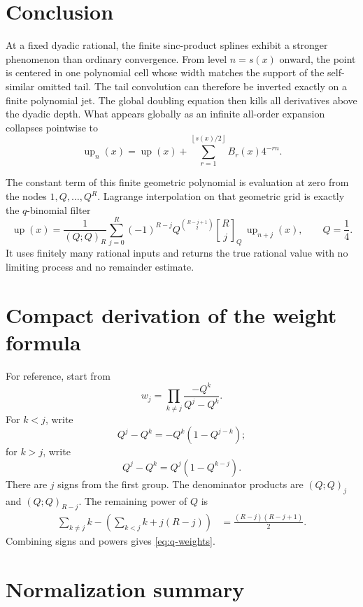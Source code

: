 \documentclass[11pt]{article}
\theoremstyle{definition}
\theoremstyle{remark}
\newcommand{\rv}{\operatorname{up}}
\newcommand{\qbinom}[3]{\genfrac{[}{]}{0pt}{}{#1}{#2}_{#3}}
\newcommand{\floor}[1]{\left\lfloor #1\right\rfloor}
\begin{document}
\section{Conclusion}

At a fixed dyadic rational, the finite sinc-product splines exhibit a stronger
phenomenon than ordinary convergence.  From level \(n=s(x)\) onward, the point
is centered in one polynomial cell whose width matches the support of the
self-similar omitted tail.  The tail convolution can therefore be inverted
exactly on a finite polynomial jet.  The global doubling equation then kills
all derivatives above the dyadic depth.  What appears globally as an infinite
all-order expansion collapses pointwise to
\[
 \rv_n(x)=\rv(x)+\sum_{r=1}^{\floor{s(x)/2}}B_r(x)4^{-rn}.
\]

The constant term of this finite geometric polynomial is evaluation at zero
from the nodes \(1,Q,\ldots,Q^R\).  Lagrange interpolation on that geometric
grid is exactly the \(q\)-binomial filter
\[
 \rv(x)=\frac{1}{(Q;Q)_R}
 \sum_{j=0}^{R}(-1)^{R-j}Q^{\binom{R-j+1}{2}}
 \qbinom{R}{j}{Q}\,\rv_{n+j}(x),
 \qquad Q=\frac14.
\]
It uses finitely many rational inputs and returns the true rational value with
no limiting process and no remainder estimate.

\appendix

\section{Compact derivation of the weight formula}

For reference, start from
\[
 w_j=\prod_{k\ne j}\frac{-Q^k}{Q^j-Q^k}.
\]
For \(k<j\), write
\[
 Q^j-Q^k=-Q^k(1-Q^{j-k});
\]
for \(k>j\), write
\[
 Q^j-Q^k=Q^j(1-Q^{k-j}).
\]
There are \(j\) signs from the first group.  The denominator products are
\((Q;Q)_j\) and \((Q;Q)_{R-j}\).  The remaining power of \(Q\) is
\begin{align*}
 \sum_{k\ne j}k-
 \left(\sum_{k<j}k+j(R-j)\right)
 &=\frac{(R-j)(R-j+1)}2.
\end{align*}
Combining signs and powers gives \cref{eq:q-weights}.

\section{Normalization summary}
\end{document}
